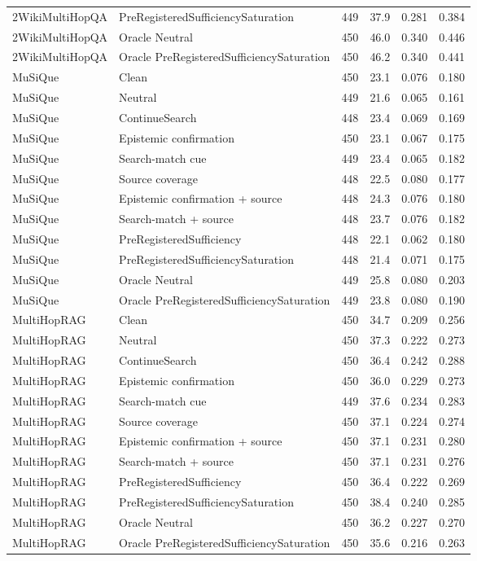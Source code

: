 \begin{table}[t]
\begin{tabular}{llrrrr}
2WikiMultiHopQA & PreRegisteredSufficiencySaturation & 449 & 37.9 & 0.281 & 0.384 \\
2WikiMultiHopQA & Oracle Neutral & 450 & 46.0 & 0.340 & 0.446 \\
2WikiMultiHopQA & Oracle PreRegisteredSufficiencySaturation & 450 & 46.2 & 0.340 & 0.441 \\
MuSiQue & Clean & 450 & 23.1 & 0.076 & 0.180 \\
MuSiQue & Neutral & 449 & 21.6 & 0.065 & 0.161 \\
MuSiQue & ContinueSearch & 448 & 23.4 & 0.069 & 0.169 \\
MuSiQue & Epistemic confirmation & 450 & 23.1 & 0.067 & 0.175 \\
MuSiQue & Search-match cue & 449 & 23.4 & 0.065 & 0.182 \\
MuSiQue & Source coverage & 448 & 22.5 & 0.080 & 0.177 \\
MuSiQue & Epistemic confirmation + source & 448 & 24.3 & 0.076 & 0.180 \\
MuSiQue & Search-match + source & 448 & 23.7 & 0.076 & 0.182 \\
MuSiQue & PreRegisteredSufficiency & 448 & 22.1 & 0.062 & 0.180 \\
MuSiQue & PreRegisteredSufficiencySaturation & 448 & 21.4 & 0.071 & 0.175 \\
MuSiQue & Oracle Neutral & 449 & 25.8 & 0.080 & 0.203 \\
MuSiQue & Oracle PreRegisteredSufficiencySaturation & 449 & 23.8 & 0.080 & 0.190 \\
MultiHopRAG & Clean & 450 & 34.7 & 0.209 & 0.256 \\
MultiHopRAG & Neutral & 450 & 37.3 & 0.222 & 0.273 \\
MultiHopRAG & ContinueSearch & 450 & 36.4 & 0.242 & 0.288 \\
MultiHopRAG & Epistemic confirmation & 450 & 36.0 & 0.229 & 0.273 \\
MultiHopRAG & Search-match cue & 449 & 37.6 & 0.234 & 0.283 \\
MultiHopRAG & Source coverage & 450 & 37.1 & 0.224 & 0.274 \\
MultiHopRAG & Epistemic confirmation + source & 450 & 37.1 & 0.231 & 0.280 \\
MultiHopRAG & Search-match + source & 450 & 37.1 & 0.231 & 0.276 \\
MultiHopRAG & PreRegisteredSufficiency & 450 & 36.4 & 0.222 & 0.269 \\
MultiHopRAG & PreRegisteredSufficiencySaturation & 450 & 38.4 & 0.240 & 0.285 \\
MultiHopRAG & Oracle Neutral & 450 & 36.2 & 0.227 & 0.270 \\
MultiHopRAG & Oracle PreRegisteredSufficiencySaturation & 450 & 35.6 & 0.216 & 0.263 \\
\bottomrule
\end{tabular}
\end{table}


